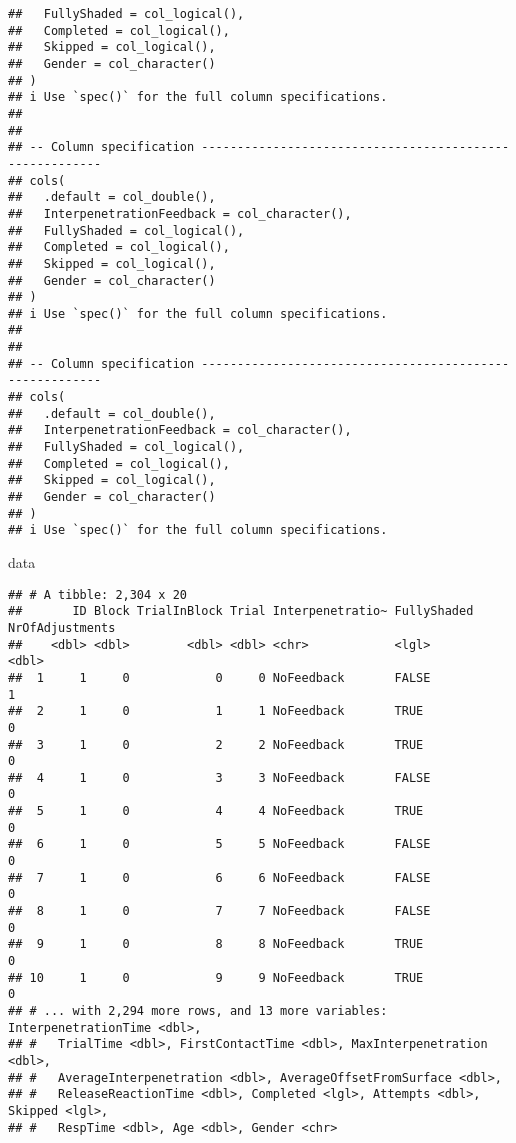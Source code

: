 \documentclass[
]{article}
\newenvironment{Shaded}{\begin{snugshade}}{\end{snugshade}}
\newcommand{\NormalTok}[1]{#1}
\begin{document}
\begin{verbatim}
##   FullyShaded = col_logical(),
##   Completed = col_logical(),
##   Skipped = col_logical(),
##   Gender = col_character()
## )
## i Use `spec()` for the full column specifications.
## 
## 
## -- Column specification --------------------------------------------------------
## cols(
##   .default = col_double(),
##   InterpenetrationFeedback = col_character(),
##   FullyShaded = col_logical(),
##   Completed = col_logical(),
##   Skipped = col_logical(),
##   Gender = col_character()
## )
## i Use `spec()` for the full column specifications.
## 
## 
## -- Column specification --------------------------------------------------------
## cols(
##   .default = col_double(),
##   InterpenetrationFeedback = col_character(),
##   FullyShaded = col_logical(),
##   Completed = col_logical(),
##   Skipped = col_logical(),
##   Gender = col_character()
## )
## i Use `spec()` for the full column specifications.
\end{verbatim}

\begin{Shaded}
\begin{Highlighting}[]
\NormalTok{data }
\end{Highlighting}
\end{Shaded}

\begin{verbatim}
## # A tibble: 2,304 x 20
##       ID Block TrialInBlock Trial Interpenetratio~ FullyShaded NrOfAdjustments
##    <dbl> <dbl>        <dbl> <dbl> <chr>            <lgl>                 <dbl>
##  1     1     0            0     0 NoFeedback       FALSE                     1
##  2     1     0            1     1 NoFeedback       TRUE                      0
##  3     1     0            2     2 NoFeedback       TRUE                      0
##  4     1     0            3     3 NoFeedback       FALSE                     0
##  5     1     0            4     4 NoFeedback       TRUE                      0
##  6     1     0            5     5 NoFeedback       FALSE                     0
##  7     1     0            6     6 NoFeedback       FALSE                     0
##  8     1     0            7     7 NoFeedback       FALSE                     0
##  9     1     0            8     8 NoFeedback       TRUE                      0
## 10     1     0            9     9 NoFeedback       TRUE                      0
## # ... with 2,294 more rows, and 13 more variables: InterpenetrationTime <dbl>,
## #   TrialTime <dbl>, FirstContactTime <dbl>, MaxInterpenetration <dbl>,
## #   AverageInterpenetration <dbl>, AverageOffsetFromSurface <dbl>,
## #   ReleaseReactionTime <dbl>, Completed <lgl>, Attempts <dbl>, Skipped <lgl>,
## #   RespTime <dbl>, Age <dbl>, Gender <chr>
\end{verbatim}
\end{document}
